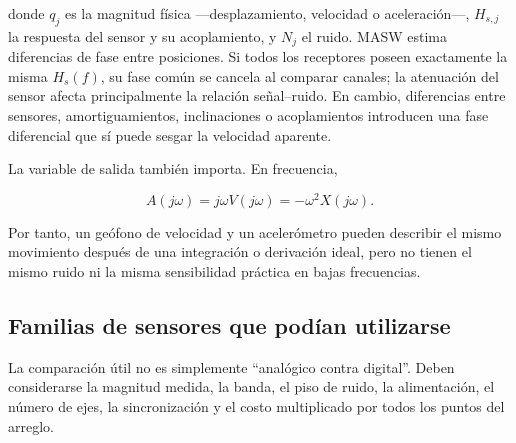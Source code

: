 donde $q_j$ es la magnitud física ---desplazamiento, velocidad o aceleración---,
$H_{s,j}$ la respuesta del sensor y su acoplamiento, y $N_j$ el ruido. MASW estima
diferencias de fase entre posiciones. Si todos los receptores poseen exactamente la
misma $H_s(f)$, su fase común se cancela al comparar canales; la atenuación del sensor
afecta principalmente la relación señal--ruido. En cambio, diferencias entre sensores,
amortiguamientos, inclinaciones o acoplamientos introducen una fase diferencial que sí
puede sesgar la velocidad aparente.

La variable de salida también importa. En frecuencia,

\begin{equation}
    A(j\omega)=j\omega V(j\omega)
    =-\omega^2X(j\omega).
\end{equation}

Por tanto, un geófono de velocidad y un acelerómetro pueden describir el mismo movimiento
después de una integración o derivación ideal, pero no tienen el mismo ruido ni la misma
sensibilidad práctica en bajas frecuencias.

\subsection{Familias de sensores que podían utilizarse}

La comparación útil no es simplemente ``analógico contra digital''. Deben considerarse
la magnitud medida, la banda, el piso de ruido, la alimentación, el número de ejes, la
sincronización y el costo multiplicado por todos los puntos del arreglo.

